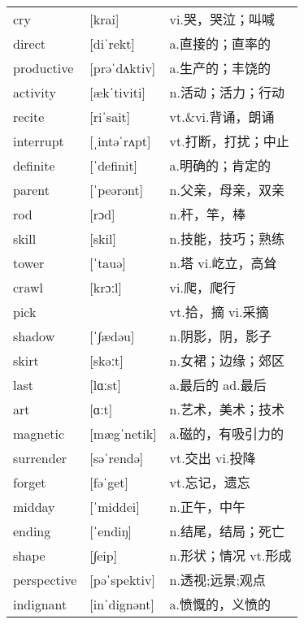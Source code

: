 \documentclass[a4paper]{article}
\begin{document}
\section{}
\begin{tabular}{l l l}

cry & [krai] & vi.哭，哭泣；叫喊 \\
direct & [diˈrekt] & a.直接的；直率的 \\
productive & [prəˈdʌktiv] & a.生产的；丰饶的 \\
activity & [ækˈtiviti] & n.活动；活力；行动 \\
recite & [riˈsait] & vt.\&vi.背诵，朗诵 \\
interrupt & [ˌintəˈrʌpt] & vt.打断，打扰；中止 \\
definite & [ˈdefinit] & a.明确的；肯定的 \\
parent & [ˈpeərənt] & n.父亲，母亲，双亲 \\
rod & [rɔd] & n.杆，竿，棒 \\
skill & [skil] & n.技能，技巧；熟练 \\
tower & [ˈtauə] & n.塔 vi.屹立，高耸 \\
crawl & [krɔːl] & vi.爬，爬行 \\
pick &  & vt.拾，摘 vi.采摘 \\
shadow & [ˈ∫ædəu] & n.阴影，阴，影子 \\
skirt & [skəːt] & n.女裙；边缘；郊区 \\
last & [lɑːst] & a.最后的 ad.最后 \\
art & [ɑːt] & n.艺术，美术；技术 \\
magnetic & [mægˈnetik] & a.磁的，有吸引力的 \\
surrender & [səˈrendə] & vt.交出 vi.投降 \\
forget & [fəˈget] & vt.忘记，遗忘 \\
midday & [ˈmiddei] & n.正午，中午 \\
ending & [ˈendiŋ] & n.结尾，结局；死亡 \\
shape & [∫eip] & n.形状；情况 vt.形成 \\
perspective & [pəˈspektiv] & n.透视;远景;观点 \\
indignant & [inˈdignənt] & a.愤慨的，义愤的 \\

\end{tabular}
\end{document}
